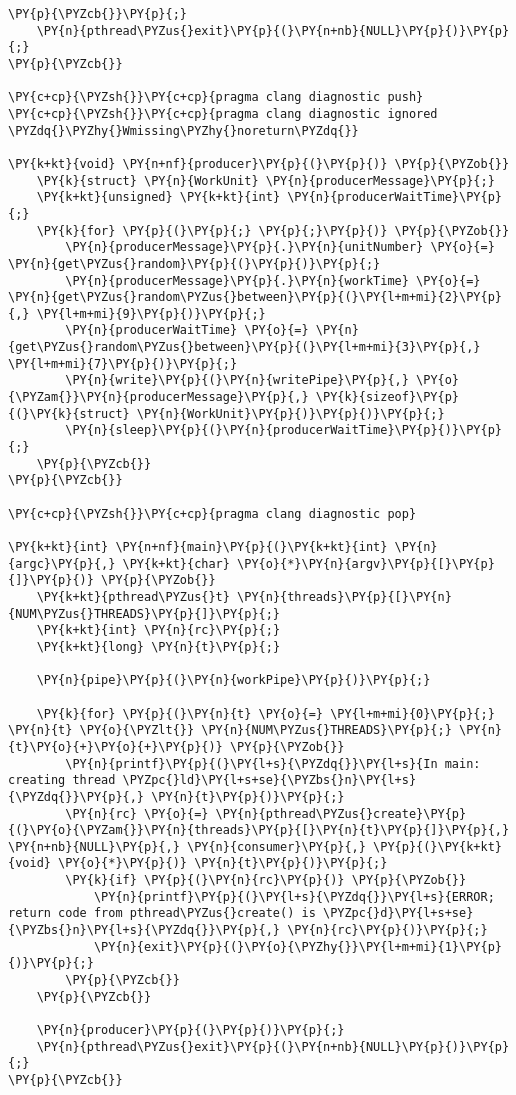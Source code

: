 \begin{Verbatim}[commandchars=\\\{\}]
    \PY{p}{\PYZcb{}}\PY{p}{;}
    \PY{n}{pthread\PYZus{}exit}\PY{p}{(}\PY{n+nb}{NULL}\PY{p}{)}\PY{p}{;}
\PY{p}{\PYZcb{}}

\PY{c+cp}{\PYZsh{}}\PY{c+cp}{pragma clang diagnostic push}
\PY{c+cp}{\PYZsh{}}\PY{c+cp}{pragma clang diagnostic ignored \PYZdq{}\PYZhy{}Wmissing\PYZhy{}noreturn\PYZdq{}}

\PY{k+kt}{void} \PY{n+nf}{producer}\PY{p}{(}\PY{p}{)} \PY{p}{\PYZob{}}
    \PY{k}{struct} \PY{n}{WorkUnit} \PY{n}{producerMessage}\PY{p}{;}
    \PY{k+kt}{unsigned} \PY{k+kt}{int} \PY{n}{producerWaitTime}\PY{p}{;}
    \PY{k}{for} \PY{p}{(}\PY{p}{;} \PY{p}{;}\PY{p}{)} \PY{p}{\PYZob{}}
        \PY{n}{producerMessage}\PY{p}{.}\PY{n}{unitNumber} \PY{o}{=} \PY{n}{get\PYZus{}random}\PY{p}{(}\PY{p}{)}\PY{p}{;}
        \PY{n}{producerMessage}\PY{p}{.}\PY{n}{workTime} \PY{o}{=} \PY{n}{get\PYZus{}random\PYZus{}between}\PY{p}{(}\PY{l+m+mi}{2}\PY{p}{,} \PY{l+m+mi}{9}\PY{p}{)}\PY{p}{;}
        \PY{n}{producerWaitTime} \PY{o}{=} \PY{n}{get\PYZus{}random\PYZus{}between}\PY{p}{(}\PY{l+m+mi}{3}\PY{p}{,} \PY{l+m+mi}{7}\PY{p}{)}\PY{p}{;}
        \PY{n}{write}\PY{p}{(}\PY{n}{writePipe}\PY{p}{,} \PY{o}{\PYZam{}}\PY{n}{producerMessage}\PY{p}{,} \PY{k}{sizeof}\PY{p}{(}\PY{k}{struct} \PY{n}{WorkUnit}\PY{p}{)}\PY{p}{)}\PY{p}{;}
        \PY{n}{sleep}\PY{p}{(}\PY{n}{producerWaitTime}\PY{p}{)}\PY{p}{;}
    \PY{p}{\PYZcb{}}
\PY{p}{\PYZcb{}}

\PY{c+cp}{\PYZsh{}}\PY{c+cp}{pragma clang diagnostic pop}

\PY{k+kt}{int} \PY{n+nf}{main}\PY{p}{(}\PY{k+kt}{int} \PY{n}{argc}\PY{p}{,} \PY{k+kt}{char} \PY{o}{*}\PY{n}{argv}\PY{p}{[}\PY{p}{]}\PY{p}{)} \PY{p}{\PYZob{}}
    \PY{k+kt}{pthread\PYZus{}t} \PY{n}{threads}\PY{p}{[}\PY{n}{NUM\PYZus{}THREADS}\PY{p}{]}\PY{p}{;}
    \PY{k+kt}{int} \PY{n}{rc}\PY{p}{;}
    \PY{k+kt}{long} \PY{n}{t}\PY{p}{;}

    \PY{n}{pipe}\PY{p}{(}\PY{n}{workPipe}\PY{p}{)}\PY{p}{;}

    \PY{k}{for} \PY{p}{(}\PY{n}{t} \PY{o}{=} \PY{l+m+mi}{0}\PY{p}{;} \PY{n}{t} \PY{o}{\PYZlt{}} \PY{n}{NUM\PYZus{}THREADS}\PY{p}{;} \PY{n}{t}\PY{o}{+}\PY{o}{+}\PY{p}{)} \PY{p}{\PYZob{}}
        \PY{n}{printf}\PY{p}{(}\PY{l+s}{\PYZdq{}}\PY{l+s}{In main: creating thread \PYZpc{}ld}\PY{l+s+se}{\PYZbs{}n}\PY{l+s}{\PYZdq{}}\PY{p}{,} \PY{n}{t}\PY{p}{)}\PY{p}{;}
        \PY{n}{rc} \PY{o}{=} \PY{n}{pthread\PYZus{}create}\PY{p}{(}\PY{o}{\PYZam{}}\PY{n}{threads}\PY{p}{[}\PY{n}{t}\PY{p}{]}\PY{p}{,} \PY{n+nb}{NULL}\PY{p}{,} \PY{n}{consumer}\PY{p}{,} \PY{p}{(}\PY{k+kt}{void} \PY{o}{*}\PY{p}{)} \PY{n}{t}\PY{p}{)}\PY{p}{;}
        \PY{k}{if} \PY{p}{(}\PY{n}{rc}\PY{p}{)} \PY{p}{\PYZob{}}
            \PY{n}{printf}\PY{p}{(}\PY{l+s}{\PYZdq{}}\PY{l+s}{ERROR; return code from pthread\PYZus{}create() is \PYZpc{}d}\PY{l+s+se}{\PYZbs{}n}\PY{l+s}{\PYZdq{}}\PY{p}{,} \PY{n}{rc}\PY{p}{)}\PY{p}{;}
            \PY{n}{exit}\PY{p}{(}\PY{o}{\PYZhy{}}\PY{l+m+mi}{1}\PY{p}{)}\PY{p}{;}
        \PY{p}{\PYZcb{}}
    \PY{p}{\PYZcb{}}

    \PY{n}{producer}\PY{p}{(}\PY{p}{)}\PY{p}{;}
    \PY{n}{pthread\PYZus{}exit}\PY{p}{(}\PY{n+nb}{NULL}\PY{p}{)}\PY{p}{;}
\PY{p}{\PYZcb{}}
\end{Verbatim}
